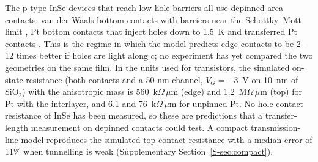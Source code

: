 \documentclass[11pt]{article}
\begin{document}
The p-type InSe devices that reach low hole barriers all use depinned area contacts: van der Waals bottom contacts with barriers near the Schottky--Mott limit \cite{refkim24}, Pt bottom contacts that inject holes down to 1.5~K \cite{refseok} and transferred Pt contacts \cite{refwei}. This is the regime in which the model predicts edge contacts to be 2--12 times better if holes are light along $c$; no experiment has yet compared the two geometries on the same film. In the units used for transistors, the simulated on-state resistance (both contacts and a 50-nm channel, $V_G=-3$~V on 10~nm of SiO$_2$) with the anisotropic mass is 560~k$\Omega\,\mu$m (edge) and 1.2~M$\Omega\,\mu$m (top) for Pt with the interlayer, and 6.1 and 76~k$\Omega\,\mu$m for unpinned Pt. No hole contact resistance of InSe has been measured, so these are predictions that a transfer-length measurement on depinned contacts could test. A compact transmission-line model reproduces the simulated top-contact resistance with a median error of 11\% when tunnelling is weak (Supplementary Section~\ref{S-sec:compact}).
\end{document}
